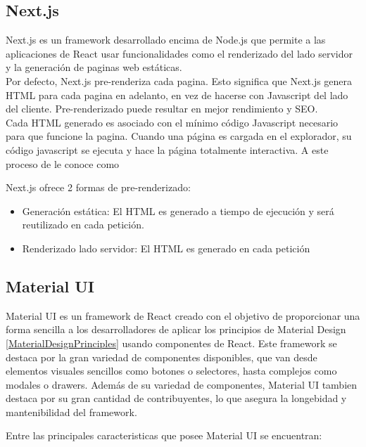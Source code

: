 \subsection{Next.js}

Next.js es un framework desarrollado encima de Node.js que permite a las aplicaciones de React usar funcionalidades como el renderizado del lado servidor y la generación de paginas web estáticas.\\

Por defecto, Next.js pre-renderiza cada pagina. Esto significa que Next.js genera HTML para cada pagina en adelanto, en vez de hacerse con Javascript del lado del cliente. Pre-renderizado puede resultar en mejor rendimiento y SEO.\\

Cada HTML generado es asociado con el mínimo código Javascript necesario para que funcione la pagina. Cuando una página es cargada en el explorador, su código javascript se ejecuta y hace la página totalmente interactiva. A este proceso de le conoce como 

Next.js ofrece 2 formas de pre-renderizado:

\begin{itemize}
    \item Generación estática: El HTML es generado a tiempo de ejecución y será reutilizado en cada petición.
    \item Renderizado lado servidor: El HTML es generado en cada petición
\end{itemize}

\subsection{Material UI}

Material UI es un framework de React creado con el objetivo de proporcionar una forma sencilla a los desarrolladores de aplicar los principios de Material Design \ref*{MaterialDesignPrinciples} usando componentes de React. Este framework se destaca por la gran variedad de componentes disponibles, que van desde elementos visuales sencillos como botones o selectores, hasta complejos como modales o drawers. Además de su variedad de componentes, Material UI tambien destaca por su gran cantidad de contribuyentes, lo que asegura la longebidad y mantenibilidad del framework.

Entre las principales caracteristicas que posee Material UI se encuentran:

